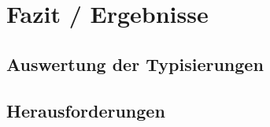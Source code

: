 \section{Fazit /  Ergebnisse}
\subsection{Auswertung der Typisierungen}
\subsection{Herausforderungen}